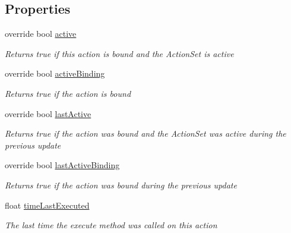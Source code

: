 \subsection*{Properties}
\begin{DoxyCompactItemize}
\item 
override bool \mbox{\hyperlink{class_valve_1_1_v_r_1_1_steam_v_r___action___vibration___source_a82d5c3aea68157b88ea8693b888b67bf}{active}}
\begin{DoxyCompactList}\small\item\em Returns true if this action is bound and the Action\+Set is active \end{DoxyCompactList}\item 
override bool \mbox{\hyperlink{class_valve_1_1_v_r_1_1_steam_v_r___action___vibration___source_a70fcfe02e0523d10e61c7008787c8121}{active\+Binding}}
\begin{DoxyCompactList}\small\item\em Returns true if the action is bound \end{DoxyCompactList}\item 
override bool \mbox{\hyperlink{class_valve_1_1_v_r_1_1_steam_v_r___action___vibration___source_a6e6f97ddcab58758406ca07a89229cc6}{last\+Active}}
\begin{DoxyCompactList}\small\item\em Returns true if the action was bound and the Action\+Set was active during the previous update \end{DoxyCompactList}\item 
override bool \mbox{\hyperlink{class_valve_1_1_v_r_1_1_steam_v_r___action___vibration___source_ab8c8888abdaff13495a29b745eef570c}{last\+Active\+Binding}}
\begin{DoxyCompactList}\small\item\em Returns true if the action was bound during the previous update \end{DoxyCompactList}\item 
float \mbox{\hyperlink{class_valve_1_1_v_r_1_1_steam_v_r___action___vibration___source_a2f425ed7a25b1835ff7a4e601494999b}{time\+Last\+Executed}}
\begin{DoxyCompactList}\small\item\em The last time the execute method was called on this action \end{DoxyCompactList}\end{DoxyCompactItemize}
